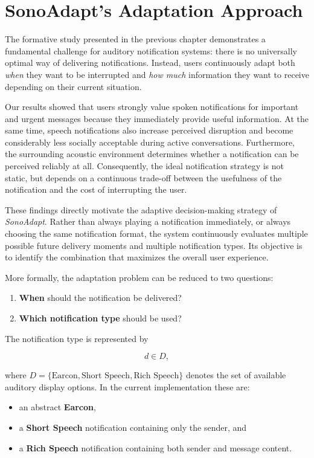 \chapter{SonoAdapt's Adaptation Approach}
\label{chap:sonoadapt_adaptation_approach}

The formative study presented in the previous chapter demonstrates a fundamental challenge for auditory notification systems: there is no universally optimal way of delivering notifications. Instead, users continuously adapt both \emph{when} they want to be interrupted and \emph{how much} information they want to receive depending on their current situation.

Our results showed that users strongly value spoken notifications for important and urgent messages because they immediately provide useful information. At the same time, speech notifications also increase perceived disruption and become considerably less socially acceptable during active conversations. Furthermore, the surrounding acoustic environment determines whether a notification can be perceived reliably at all. Consequently, the ideal notification strategy is not static, but depends on a continuous trade-off between the usefulness of the notification and the cost of interrupting the user.

These findings directly motivate the adaptive decision-making strategy of \textit{SonoAdapt}. Rather than always playing a notification immediately, or always choosing the same notification format, the system continuously evaluates multiple possible future delivery moments and multiple notification types. Its objective is to identify the combination that maximizes the overall user experience.

More formally, the adaptation problem can be reduced to two questions:

\begin{enumerate}
    \item \textbf{When} should the notification be delivered?
    \item \textbf{Which notification type} should be used?
\end{enumerate}

The notification type is represented by

\[
d \in D,
\]

where $D = \{\text{Earcon}, \text{Short Speech}, \text{Rich Speech}\}$ denotes the set of available auditory display options. In the current implementation these are:

\begin{itemize}
    \item an abstract \textbf{Earcon},
    \item a \textbf{Short Speech} notification containing only the sender, and
    \item a \textbf{Rich Speech} notification containing both sender and message content.
\end{itemize}

